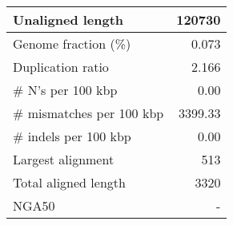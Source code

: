\documentclass[12pt,a4paper]{article}
\begin{document}
\begin{table}[ht]
\begin{center}
\begin{tabular}{|l*{1}{|r}|}
Unaligned length & 120730 \\ \hline
Genome fraction (\%) & 0.073 \\ \hline
Duplication ratio & 2.166 \\ \hline
\# N's per 100 kbp & 0.00 \\ \hline
\# mismatches per 100 kbp & 3399.33 \\ \hline
\# indels per 100 kbp & 0.00 \\ \hline
Largest alignment & 513 \\ \hline
Total aligned length & 3320 \\ \hline
NGA50 & - \\ \hline
\end{tabular}
\end{center}
\end{table}
\end{document}
